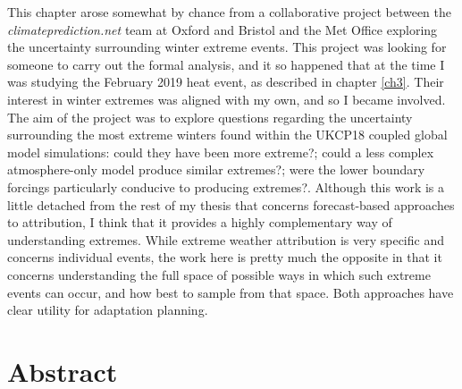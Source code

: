  This chapter arose somewhat by chance from a collaborative project between the \emph{climateprediction.net} team at Oxford and Bristol and the Met Office exploring the uncertainty surrounding winter extreme events. This project was looking for someone to carry out the formal analysis, and it so happened that at the time I was studying the February 2019 heat event, as described in chapter \ref{ch3}. Their interest in winter extremes was aligned with my own, and so I became involved. The aim of the project was to explore questions regarding the uncertainty surrounding the most extreme winters found within the UKCP18 coupled global model simulations: could they have been more extreme?; could a less complex atmosphere-only model produce similar extremes?; were the lower boundary forcings particularly conducive to producing extremes?. Although this work is a little detached from the rest of my thesis that concerns forecast-based approaches to attribution, I think that it provides a highly complementary way of understanding extremes. While extreme weather attribution is very specific and concerns individual events, the work here is pretty much the opposite in that it concerns understanding the full space of possible ways in which such extreme events can occur, and how best to sample from that space. Both approaches have clear utility for adaptation planning.

\section{Abstract}

